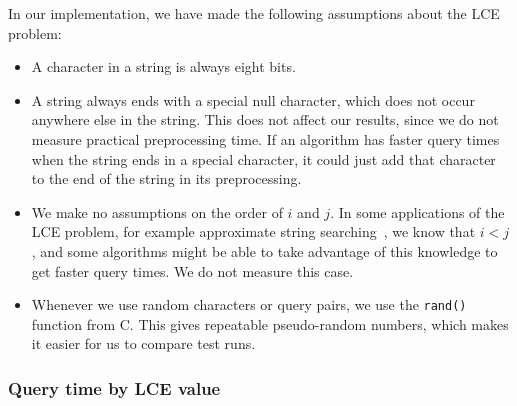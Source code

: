 \documentclass[a4]{article}
\begin{document}
In our implementation, we have made the following assumptions about the LCE problem:
\begin{itemize}
\item A character in a string is always eight bits.
\item A string always ends with a special null character, which does not occur anywhere else in the string. This does not affect our results, since we do not measure practical preprocessing time. If an algorithm has faster query times when the string ends in a special character, it could just add that character to the end of the string in its preprocessing.
\item We make no assumptions on the order of $i$ and $j$. In some applications of the LCE problem, for example approximate string searching~\cite{approx-search}, we know that $i<j$, and some algorithms might be able to take advantage of this knowledge to get faster query times. We do not measure this case.
\item Whenever we use random characters or query pairs, we use the \texttt{rand()} function from C. This gives repeatable pseudo-random numbers, which makes it easier for us to compare test runs.
\end{itemize}


\subsubsection{Query time by LCE value}
\end{document}
